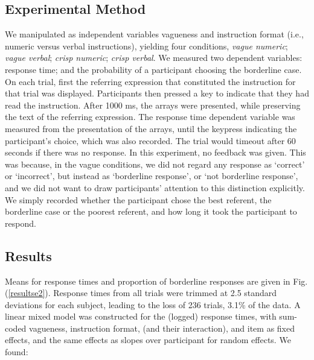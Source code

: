 \subsection{Experimental Method} 

We manipulated as independent variables vagueness and instruction format (i.e., numeric versus verbal instructions), yielding four conditions, \emph{vague numeric}; \emph{vague verbal}; \emph{crisp numeric}; \emph{crisp verbal}.
We measured two dependent variables: response time; and the probability of a participant choosing the borderline case.
On each trial, first the referring expression that constituted the instruction for that trial was displayed. 
Participants then pressed a key to indicate that they had read the instruction. 
After 1000 ms, the arrays were presented, while preserving the text of the referring expression. 
The response time dependent variable was measured from the presentation of the arrays, until the keypress indicating the participant's choice, which was also recorded. 
The trial would timeout after 60 seconds if there was no response.
In this experiment, no feedback was given. 
This was because, in the vague conditions, we did not regard any response as `correct' or `incorrect', but instead as `borderline response', or `not borderline response', and we did not want to draw participants' attention to this distinction explicitly. 
We simply recorded whether the participant chose the best referent, the borderline case or the poorest referent, and how long it took the participant to respond.

\subsection{Results} 

Means for response times and proportion of borderline responses are given in Fig. (\ref{resultse2}). 
Response times from all trials were trimmed at 2.5 standard deviations for each subject, leading to the loss of 236 trials, 3.1\% of the data. 
A linear mixed model was constructed for the (logged) response times, 
with sum-coded vagueness, instruction format, (and their interaction), and item as fixed effects, and the same effects as slopes over participant for random effects. We found:

